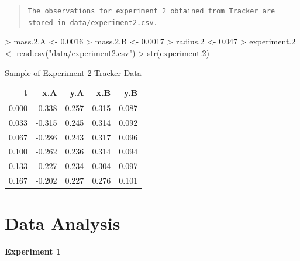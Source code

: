 \documentclass[11pt]{article}
\begin{document}
\begin{quote}
{\tt The observations for experiment 2 obtained from Tracker are stored in data/experiment2.csv.}
\end{quote}

\begin{Schunk}
\begin{Sinput}
> mass.2.A <- 0.0016
> mass.2.B <- 0.0017
> radius.2 <- 0.047
> experiment.2 <- read.csv("data/experiment2.csv")
> str(experiment.2)
\end{Sinput}
\end{Schunk}

\begin{table}

\caption{\label{tab:}Sample of Experiment 2 Tracker Data}
\centering
\begin{tabular}[t]{r|r|r|r|r}
\hline
t & x.A & y.A & x.B & y.B\\
\hline
0.000 & -0.338 & 0.257 & 0.315 & 0.087\\
\hline
0.033 & -0.315 & 0.245 & 0.314 & 0.092\\
\hline
0.067 & -0.286 & 0.243 & 0.317 & 0.096\\
\hline
0.100 & -0.262 & 0.236 & 0.314 & 0.094\\
\hline
0.133 & -0.227 & 0.234 & 0.304 & 0.097\\
\hline
0.167 & -0.202 & 0.227 & 0.276 & 0.101\\
\hline
\end{tabular}
\end{table}
\section{Data Analysis}

{\bf Experiment 1}\\
\end{document}

